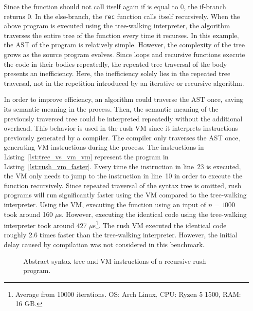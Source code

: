Since the function should not call itself again if  is equal to 0, the if-branch returns 0.
In the else-branch, the \texttt{rec} function calls itself recursively.
When the above program is executed using the tree-walking interpreter, the algorithm traverses the entire tree of the  function every time it recurses.
In this example, the AST of the program is relatively simple.
However, the complexity of the tree grows as the source program evolves.
Since loops and recursive functions execute the code in their bodies repeatedly, the repeated tree traversal of the body presents an inefficiency.
Here, the inefficiency solely lies in the repeated tree traversal, not in the repetition introduced by an iterative or recursive algorithm.

In order to improve efficiency, an algorithm could traverse the AST once, saving its semantic meaning in the process.
Then, the semantic meaning of the previously traversed tree could be interpreted repeatedly without the additional overhead.
This behavior is used in the rush VM since it interprets instructions previously generated by a compiler.
The compiler only traverses the AST once, generating VM instructions during the process.
The instructions in Listing~\ref{lst:tree_vs_vm_vm} represent the program in Listing~\ref{lst:rush_vm_faster}.
Every time the  instruction in line~23 is executed, the VM only needs to jump to the instruction in line~10 in order to execute the  function recursively.
Since repeated traversal of the syntax tree is omitted, rush programs will run significantly faster using the VM compared to the tree-walking interpreter.
Using the VM, executing the  function using an input of $n = 1000$ took around 160 $\mu$s.
However, executing the identical code using the tree-walking interpreter took around 427 $\mu$s\footnote{Average from 10000 iterations. OS: Arch Linux, CPU: Ryzen 5 1500, RAM: 16 GB.}.
The rush VM executed the identical code roughly 2.6 times faster than the tree-walking interpreter.
However, the initial delay caused by compilation was not considered in this benchmark.

\begin{wrapfigure}{R}{.56\textwidth}
	\begin{adjustbox}{max totalsize={\textwidth}{!},center}
	\end{adjustbox}
	\caption{Abstract syntax tree and VM instructions of a recursive rush program.}\label{fig:tree_vs_vm_tree}
\end{wrapfigure}


